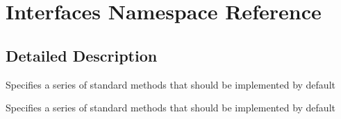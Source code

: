 \hypertarget{namespace_interfaces}{}\section{Interfaces Namespace Reference}
\label{namespace_interfaces}


\subsection{Detailed Description}
Specifies a series of standard methods that should be implemented by default

Specifies a series of standard methods that should be implemented by default